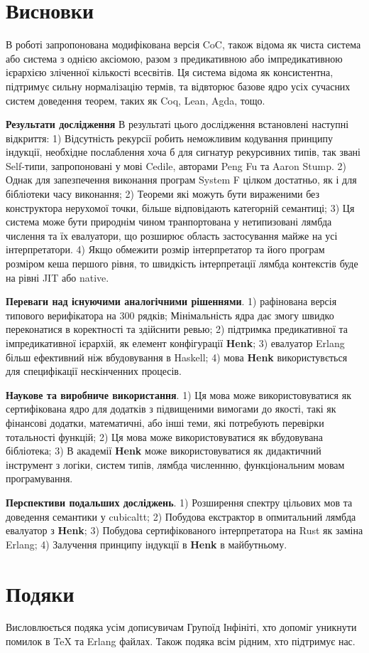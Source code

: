 \documentclass{article}
\begin{document}
\section{Висновки}
В роботі запропонована модифікована версія CoC, також відома як чиста система або система з однією аксіомою, разом
з предикативною або імпредикативною ієрархією зліченної кількості всесвітів. Ця система відома як консистентна,
підтримує сильну нормалізацію термів, та відвторює базове ядро усіх сучасних систем доведення теорем, таких як Coq, Lean, Agda, тощо.

{\bf Результати дослідження}
В результаті цього дослідження встановлені наступні відкриття:
1) Відсутність рекурсії робить неможливим кодування принципу індукції, необхідне послаблення хоча б для сигнатур
   рекурсивних типів, так звані Self-типи, запропоновані у мові Cedile, авторами Peng Fu та Aaron Stump\cite{Fu14}.
2) Однак для запезпечення виконання програм System F цілком достатньо, як і для бібліотеки часу виконання;
2) Теореми які можуть бути вираженими без конструктора нерухомої точки, більше відповідають категорній семантиці;
3) Ця система може бути природнім чином транпортована у нетипизовані лямбда числення та їх евалуатори, що розширює
   область застосування майже на усі інтерпретатори.
4) Якщо обмежити розмір інтерпретатор та його програм розміром кеша першого рівня,
   то швидкість інтерпретації лямбда контекстів буде на рівні JIT або native.

{\bf Переваги над існуючими аналогічними рішеннями}.
1) рафінована версія типового верифікатора на 300 рядків; Мінімальність ядра дає змогу швидко переконатися в коректності та здійснити ревью;
2) підтримка предикативної та імпредикативної ієрархій, як елемент конфігурації {\bf Henk};
3) евалуатор Erlang більш ефективний ніж вбудовування в Haskell;
4) мова {\bf Henk} використувється для специфікації нескінченних процесів.

{\bf Наукове та виробниче використання}.
1) Ця мова може використовуватися як сертифікована ядро для додатків з підвищеними вимогами до якості,
такі як фінансові додатки, математичні, або інші теми, які потребують перевірки тотальності функцій;
2) Ця мова може використовуватися як вбудовувана бібліотека;
3) В академії {\bf Henk} може використовуватися як дидактичний інструмент з логіки, систем типів, лямбда численнню, функціональним мовам програмування.

{\bf Перспективи подальших досліджень}.
1) Розширення спектру цільових мов та доведення семантики у cubicaltt;
2) Побудова екстрактор в опмитальний лямбда евалуатор з {\bf Henk};
3) Побудова сертифікованого інтерпретатора на Rust як заміна Erlang;
4) Залучення принципу індукції в {\bf Henk} в майбутньому.

\section{Подяки}
Висловлюється подяка усім дописувичам Групоїд Інфініті, хто допоміг уникнути помилок в TeX та Erlang файлах.
Також подяка всім рідним, хто підтримує нас.



\end{document}
